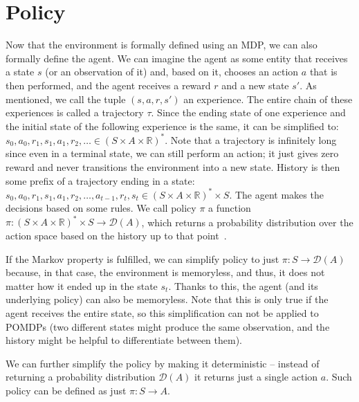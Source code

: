 \documentclass[
  digital,     %
  oneside,     %
  nosansbold,  %
  nocolorbold, %
  lof,         %
  lot,         %
]{fithesis4}
\begin{document}
\section{Policy}
Now that the environment is formally defined using an MDP, we can also formally define the agent. We can imagine the agent as some entity that receives a state $s$ (or an observation of it) and, based on it, chooses an action $a$ that is then performed, and the agent receives a reward $r$ and a new state $s'$. As mentioned, we call the tuple $(s, a, r, s')$ an experience. The entire chain of these experiences is called a trajectory $\tau$. Since the ending state of one experience and the initial state of the following experience is the same, it can be simplified to: $s_0,a_0,r_1,s_1,a_1,r_2,\dotsc \in (S\times A \times \mathbb{R})^{*}$. Note that a trajectory is infinitely long since even in a terminal state, we can still perform an action; it just gives zero reward and never transitions the environment into a new state. History is then some prefix of a trajectory ending in a state: $s_0,a_0,r_1,s_1,a_1,r_2,\dotsc, a_{t-1},r_t,s_t\in (S\times A \times \mathbb{R})^{*}\times S$. The agent makes the decisions based on some rules. We call policy $\pi$ a function $\pi\colon (S\times A \times \mathbb{R})^{*}\times S \to \mathcal{D}(A)$, which returns a probability distribution over the action space based on the history up to that point~\cite[p. 19]{PA230}.

If the Markov property is fulfilled, we can simplify policy to just $\pi\colon S \to \mathcal{D}(A)$ because, in that case, the environment is memoryless, and thus, it does not matter how it ended up in the state $s_t$. Thanks to this, the agent (and its underlying policy) can also be memoryless. Note that this is only true if the agent receives the entire state, so this simplification can not be applied to POMDPs (two different states might produce the same observation, and the history might be helpful to differentiate between them).

We can further simplify the policy by making it deterministic -- instead of returning a probability distribution $\mathcal{D}(A)$ it returns just a single action $a$. Such policy can be defined as just $\pi\colon S \to A$.
\end{document}

